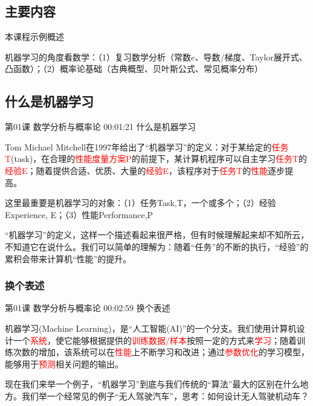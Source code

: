 \documentclass[UTF8]{ctexbook}
\begin{document}
\subsection{主要内容}

本课程示例概述

机器学习的角度看数学：（1）复习数学分析（常数$e$、导数/梯度、Taylor展开式、凸函数）；（2）概率论基础（古典概型、贝叶斯公式、常见概率分布）

\subsection{什么是机器学习}

第01课 数学分析与概率论 00:01:21 什么是机器学习

 Tom Michael Mitchell在1997年给出了“机器学习”的定义：对于某给定的\textcolor{red}{任务T}(task)，在合理的\textcolor{red}{性能度量方案P}的前提下，某计算机程序可以自主学习\textcolor{red}{任务T}的\textcolor{red}{经验E}；随着提供合适、优质、大量的\textcolor{red}{经验E}，该程序对于\textcolor{red}{任务T}的\textcolor{red}{性能}逐步提高。

这里最重要是机器学习的对象：（1）任务Task,T，一个或多个；（2）经验Experience, E；（3）性能Performance,P

“机器学习”的定义，这样一个描述看起来很严格，但有时候理解起来却不知所云，不知道它在说什么。我们可以简单的理解为：随着“任务”的不断的执行，“经验”的累积会带来计算机“性能”的提升。

\subsubsection{换个表述}

第01课 数学分析与概率论 00:02:59 换个表述

机器学习(Machine Learning)，是“人工智能(AI)”的一个分支。我们使用计算机设计一个\textcolor{red}{系统}，使它能够根据提供的\textcolor{red}{训练数据/样本}按照一定的方式来\textcolor{red}{学习}；随着训练次数的增加，该系统可以在\textcolor{red}{性能}上不断学习和改进；通过\textcolor{red}{参数优化}的学习模型，能够用于\textcolor{red}{预测}相关问题的输出。

现在我们来举一个例子，“机器学习”到底与我们传统的“算法”最大的区别在什么地方。我们举一个经常见的例子“无人驾驶汽车”，思考：如何设计无人驾驶机动车？
\end{document}
